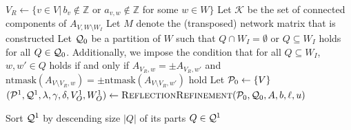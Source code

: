 \documentclass[pdflatex,sn-mathphys-num]{sn-jnl}%
\theoremstyle{thmstyleone}%
\theoremstyle{thmstylethree}%
\theoremstyle{thmstyletwo}%
\begin{document}
{\footnotesize{
\begin{algorithm}[H]
    \caption{Detecting DRCR for MILP using affine TU decompositions.}
    \label{algo_eos}

    \LinesNumbered

    $V_R\gets \{v\in V | \, b_v \notin \mathbb{Z}$ or $a_{v,w}\notin\mathbb{Z}$ for some $w\in W\}$\label{algo_eos_start}\;
    Let $\mathcal{K}$ be the set of connected components of $A_{V, W \setminus W_I}$\;
    Let $M$ denote the (transposed) network matrix that is constructed\;
    \label{algo_eos_point1}
    Let $\mathcal{Q}_0$ be a partition of $W$ such that $Q\cap W_I = \emptyset$ or $Q\subseteq W_I$ holds for all $Q\in \mathcal{Q}_0$. Additionally, we impose the condition that for all $Q\subseteq W_I$, $w,w'\in Q$ holds if and only if $A_{V_R,w} = \pm A_{V_R,w'}$ and $\mathrm{ntmask}(A_{V\setminus V_R,w}) = \pm \mathrm{ntmask}(A_{V\setminus V_R,w'})$ hold\;\label{algo_eos_point2}
    Let $\mathcal{P}_0 \gets \{V\}$\;
    $(\mathcal{P}^1,\mathcal{Q}^1, \lambda, \gamma, \delta, V^1_O, W^1_O) \gets \textsc{ReflectionRefinement}(\mathcal{P}_0, \mathcal{Q}_0, A, b, \ell, u)$\label{algo_eos_first_refine}\;

    Sort $\mathcal{Q}^1$ by descending size $|Q|$ of its parts $Q \in \mathcal{Q}^1$\label{algo_eos_start_ATU}\;
\end{algorithm}}}
\end{document}
